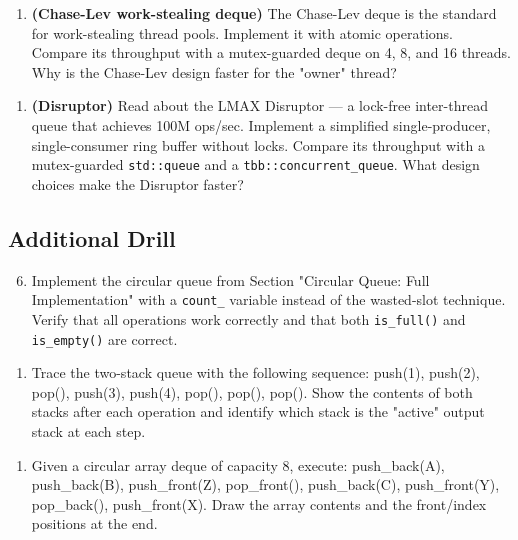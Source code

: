 \begin{enumerate}
\item \textbf{(Chase-Lev work-stealing deque)} The Chase-Lev deque is the standard for work-stealing thread pools. Implement it with atomic operations. Compare its throughput with a mutex-guarded deque on 4, 8, and 16 threads. Why is the Chase-Lev design faster for the "owner" thread?
\end{enumerate}

\begin{enumerate}
\item \textbf{(Disruptor)} Read about the LMAX Disruptor — a lock-free inter-thread queue that achieves 100M ops/sec. Implement a simplified single-producer, single-consumer ring buffer without locks. Compare its throughput with a mutex-guarded \texttt{std::queue} and a \texttt{tbb::concurrent\_queue}. What design choices make the Disruptor faster?
\end{enumerate}

\subsection{Additional Drill}

\begin{enumerate}
\setcounter{enumi}{5}
\item Implement the circular queue from Section "Circular Queue: Full Implementation" with a \texttt{count\_} variable instead of the wasted-slot technique. Verify that all operations work correctly and that both \texttt{is\_full()} and \texttt{is\_empty()} are correct.
\end{enumerate}

\begin{enumerate}
\item Trace the two-stack queue with the following sequence: push(1), push(2), pop(), push(3), push(4), pop(), pop(), pop(). Show the contents of both stacks after each operation and identify which stack is the "active" output stack at each step.
\end{enumerate}

\begin{enumerate}
\item Given a circular array deque of capacity 8, execute: push\_back(A), push\_back(B), push\_front(Z), pop\_front(), push\_back(C), push\_front(Y), pop\_back(), push\_front(X). Draw the array contents and the front/index positions at the end.
\end{enumerate}

